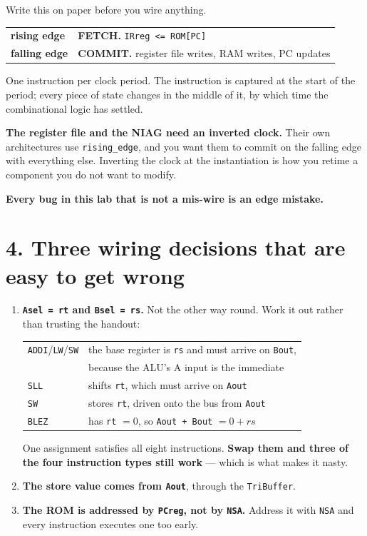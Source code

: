 \documentclass[11pt]{article}
\newcommand{\code}[1]{\texttt{#1}}
\begin{document}
Write this on paper before you wire anything.

\begin{center}
\begin{tabular}{ll}
\toprule
\textbf{rising edge} & \textbf{FETCH.} \quad \code{IRreg <= ROM[PC]} \\
\textbf{falling edge} & \textbf{COMMIT.} \quad register file writes, RAM writes, PC updates \\
\bottomrule
\end{tabular}
\end{center}

One instruction per clock period. The instruction is captured at the start of
the period; every piece of state changes in the middle of it, by which time the
combinational logic has settled.

\textbf{The register file and the NIAG need an inverted clock.} Their own
architectures use \code{rising\_edge}, and you want them to commit on the
falling edge with everything else. Inverting the clock at the instantiation is
how you retime a component you do not want to modify.

\textbf{Every bug in this lab that is not a mis-wire is an edge mistake.}

\section*{4. Three wiring decisions that are easy to get wrong}

\begin{enumerate}[leftmargin=1.8em,itemsep=3pt]
\item \textbf{\code{Asel = rt} and \code{Bsel = rs}.} Not the other way round.
Work it out rather than trusting the handout:

\begin{center}
\begin{tabular}{ll}
\toprule
\code{ADDI}/\code{LW}/\code{SW} & the base register is \code{rs} and must arrive on \code{Bout}, \\
 & because the ALU's A input is the immediate \\
\code{SLL} & shifts \code{rt}, which must arrive on \code{Aout} \\
\code{SW} & stores \code{rt}, driven onto the bus from \code{Aout} \\
\code{BLEZ} & has \code{rt} $= 0$, so \code{Aout + Bout} $= 0 + rs$ \\
\bottomrule
\end{tabular}
\end{center}

One assignment satisfies all eight instructions. \textbf{Swap them and three of
the four instruction types still work} --- which is what makes it nasty.

\item \textbf{The store value comes from \code{Aout}}, through the
\code{TriBuffer}.

\item \textbf{The ROM is addressed by \code{PCreg}, not by \code{NSA}.} Address
it with \code{NSA} and every instruction executes one too early.
\end{enumerate}
\end{document}
